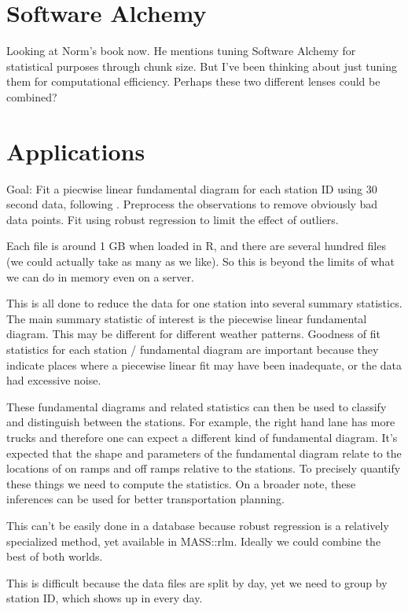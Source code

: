 \documentclass[12pt]{article}
\begin{document}
\section{Software Alchemy}

Looking at Norm's book now. He mentions tuning Software Alchemy for
statistical purposes through chunk size. But I've been thinking about just
tuning them for computational efficiency. Perhaps these two different
lenses could be combined?

\section{Applications}

Goal: Fit a piecwise linear fundamental diagram for each station ID using
30 second data, following \cite{li2011fundamental}. Preprocess the
observations to remove obviously bad data points.  Fit using robust
regression to limit the effect of outliers.  

Each file is around 1 GB when loaded in R, and there are several hundred
files (we could actually take as many as we like). So this is beyond the
limits of what we can do in memory even on a server.

This is all done to reduce the data for one station into several summary
statistics. The main summary statistic of interest is the piecewise linear
fundamental diagram. This may be different for different weather patterns. 
Goodness of fit statistics for each station / fundamental diagram are
important because they indicate places where a piecewise linear fit may
have been inadequate, or the data had excessive noise.

These fundamental diagrams and related statistics can then be used to
classify and distinguish between the stations. For example, the right hand
lane has more trucks and therefore one can expect a different kind of
fundamental diagram. It's expected that the shape and parameters of the
fundamental diagram relate to the locations of on ramps and off ramps
relative to the stations. To precisely quantify these things we need to
compute the statistics. On a broader note, these inferences can be used for
better transportation planning.

This can't be easily done in a database because robust regression is
a relatively specialized method, yet available in MASS::rlm.
Ideally we could combine the best of both worlds.

This is difficult because the data files are split by day, yet we
need to group by station ID, which shows up in every day.
\end{document}
